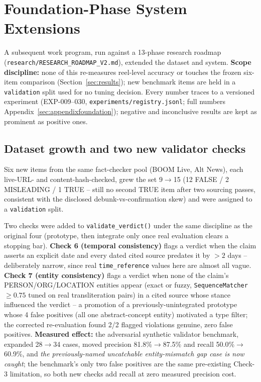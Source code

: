 \documentclass[conference]{IEEEtran}
\begin{document}
\section{Foundation-Phase System Extensions}
\label{sec:foundationphase}

A subsequent work program, run against a 13-phase research roadmap
(\texttt{research/RESEARCH\_ROADMAP\_V2.md}), extended the dataset and
system. \textbf{Scope discipline:} none of this re-measures reel-level
accuracy or touches the frozen six-item comparison
(Section~\ref{sec:results}); new benchmark items are held in a
\texttt{validation} split used for no tuning decision. Every number
traces to a versioned experiment (EXP-009--030,
\texttt{experiments/registry.jsonl}; full numbers
Appendix~\ref{sec:appendixfoundation}); negative and inconclusive
results are kept as prominent as positive ones.

\subsection{Dataset growth and two new validator checks}
\label{sec:newchecks}
Six new items from the same fact-checker pool (BOOM Live, Alt News),
each live-URL- and content-hash-checked, grew the set 9$\to$15
(12 FALSE / 2 MISLEADING / 1 TRUE -- still no second TRUE item after two
sourcing passes, consistent with the disclosed debunk-vs-confirmation
skew) and were assigned to a \texttt{validation} split.

Two checks were added to \texttt{validate\_verdict()} under the same
discipline as the original four (prototype, then integrate only once
real evaluation clears a stopping bar). \textbf{Check 6 (temporal
consistency)} flags a verdict when the claim asserts an explicit date
and every dated cited source predates it by $>2$ days -- deliberately
narrow, since real \texttt{time\_reference} values here are almost all
vague. \textbf{Check 7 (entity consistency)} flags a verdict when none
of the claim's PERSON/ORG/LOCATION entities appear (exact or fuzzy,
\texttt{SequenceMatcher} $\geq 0.75$ tuned on real transliteration
pairs) in a cited source whose stance influenced the verdict -- a
promotion of a previously-unintegrated prototype whose 4 false positives
(all one abstract-concept entity) motivated a type filter; the
corrected re-evaluation found 2/2 flagged violations genuine, zero
false positives. \textbf{Measured effect:} the adversarial synthetic
validator benchmark, expanded 28$\to$34 cases, moved precision
81.8\%$\to$87.5\% and recall 50.0\%$\to$60.9\%, and \emph{the
previously-named uncatchable entity-mismatch gap case is now caught};
the benchmark's only two false positives are the same pre-existing
Check-3 limitation, so both new checks add recall at zero measured
precision cost.
\end{document}
